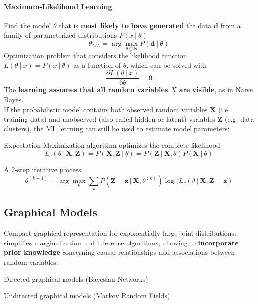 \documentclass[10pt]{report}
\begin{document}
\paragraph{Maximum-Likelihood Learning} Find the model $\theta$ that is \textbf{most likely to have generated} the data $\mathbf{d}$ from a family of parameterized distributions $P(x\:|\:\theta)$
$$\theta_{ML} = \arg\max_{\theta\in \Theta} P(\mathbf{d}\:|\:\theta)$$
Optimization problem that considers the likelihood function $L(\theta\:|\:x)=P(x\:|\:\theta)$
as a function of $\theta$, which can be solved with $$\frac{\partial L(\theta\:|\:x)}{\partial\theta}=0$$
The \textbf{learning assumes that all random variables $X$ are visible}, as in Naive Bayes.\\
If the probabilistic model contains both observed random variables $\mathbf{X}$ (i.e. training data) and unobserved (also called hidden or latent) variables $\mathbf{Z}$ (e.g. data clusters), the ML learning can still be used to estimate model parameters:
\begin{list}{}{}
	\item Expectation-Maximization algorithm optimizes the complete likelihood
	$$L_c(\theta\:|\:\mathbf{X},\mathbf{Z})=P(\mathbf{X},\mathbf{Z}\:|\:\theta) = P(\mathbf{Z}\:|\:\mathbf{X},\theta)P(\mathbf{X}\:|\:\theta)$$
	\item A 2-step iterative process
	$$\theta^{(k+1)} = \arg\max_\theta\sum_{\mathbf{z}}P(\mathbf{Z}=\mathbf{z}\:|\:\mathbf{X},\theta^{(k)})\log(L_c(\theta\:|\:\mathbf{X},\mathbf{Z}=\mathbf{z})$$
\end{list}
\subsection{Graphical Models}
Compact graphical representation for exponentially large joint distributions: simplifies marginalization and inference algorithms, allowing to \textbf{incorporate prior knowledge} concerning causal relationships and associations between random variables.\begin{list}{}{}
	\item Directed graphical models (Bayesian Networks)
	\item Undirected graphical models (Markov Random Fields)
\end{list}
\end{document}
